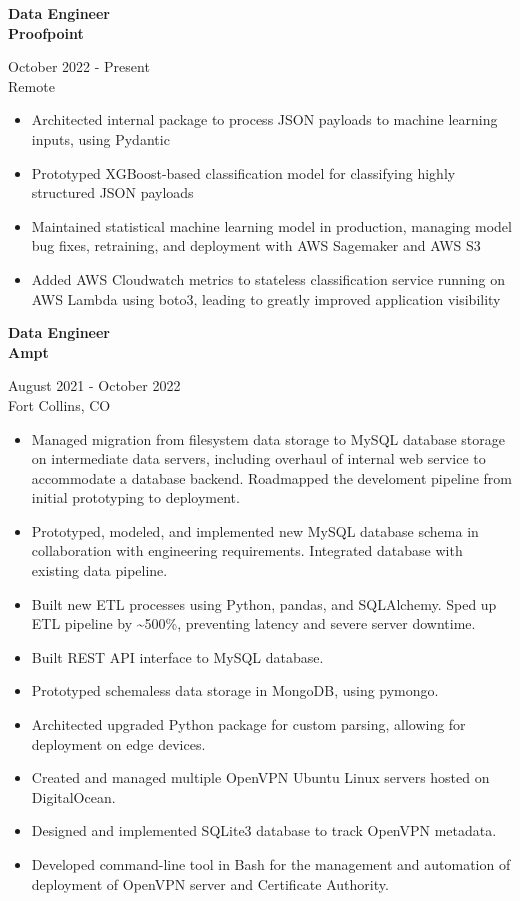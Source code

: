 \documentclass{article}
\newcommand{\resumeSubheading}[5]{
\noindent\begin{minipage}{0.5\textwidth}
	\begin{flushleft}
	\textbf{#1}\\
	\textbf{#2}\\
	\end{flushleft}
\end{minipage}%
\hfill
\begin{minipage}{0.5\textwidth}
	\begin{flushright}
	#3\\
	#4\\
	\end{flushright}
\end{minipage}%
\newline
#5
}
\begin{document}
\resumeSubheading{Data Engineer}{Proofpoint}{October 2022 - Present}{Remote}{
\begin{itemize}

	\item Architected internal package to process JSON payloads to machine learning inputs, using Pydantic
	\item Prototyped XGBoost-based classification model for classifying highly structured JSON payloads
	\item Maintained statistical machine learning model in production, managing model bug fixes, retraining, and deployment with AWS Sagemaker and AWS S3
	\item Added AWS Cloudwatch metrics to stateless classification service running on AWS Lambda using boto3, leading to greatly improved application visibility

\end{itemize}
}

\resumeSubheading{Data Engineer}{Ampt}{August 2021 - October 2022}{Fort Collins, CO}{
\begin{itemize}

	\item Managed migration from filesystem data storage to MySQL database storage on intermediate data servers, including overhaul of internal web service to accommodate a database backend. Roadmapped the develoment pipeline from initial prototyping to deployment.
	\item Prototyped, modeled, and implemented new MySQL database schema in collaboration with engineering requirements. Integrated database with existing data pipeline. 
	\item Built new ETL processes using Python, pandas, and SQLAlchemy.  Sped up ETL pipeline by \textasciitilde500\%, preventing latency and severe server downtime.
	\item Built REST API interface to MySQL database.
	\item Prototyped schemaless data storage in MongoDB, using pymongo. %
	\item Architected upgraded Python package for custom parsing, allowing for deployment on edge devices. %
	\item Created and managed multiple OpenVPN Ubuntu Linux servers hosted on DigitalOcean.
	\item Designed and implemented SQLite3 database to track OpenVPN metadata. %
	\item Developed command-line tool in Bash for the management and automation of deployment of OpenVPN server and Certificate Authority. %
\end{itemize}
}
\end{document}
